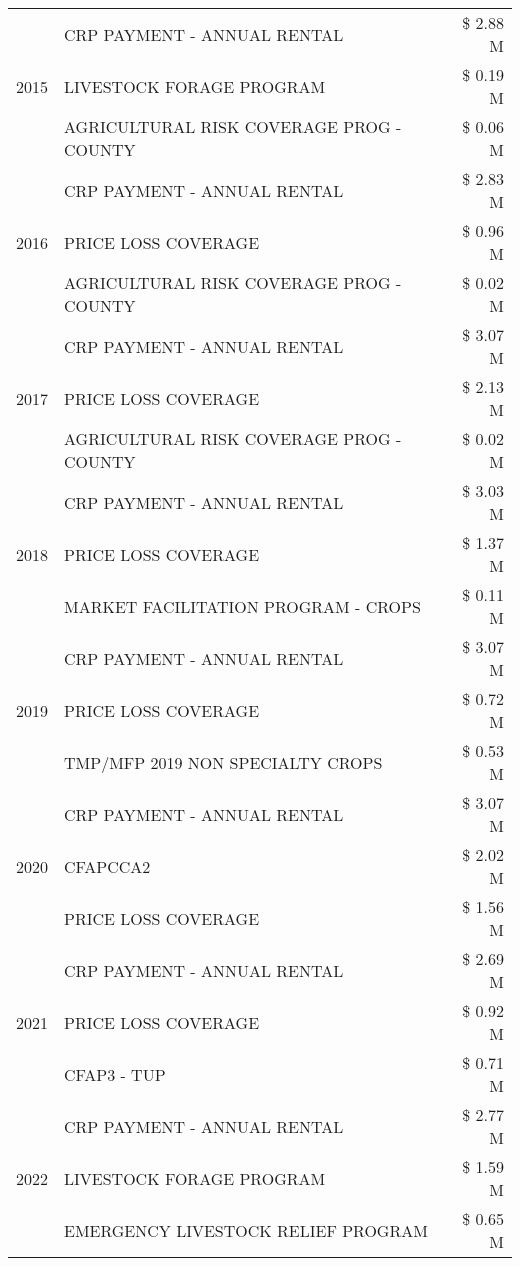 \begin{tabular}{llr}
\cline{1-3}
\multirow[t]{3}{*}{2015} & CRP PAYMENT - ANNUAL RENTAL & \$ 2.88 M \\
 & LIVESTOCK FORAGE PROGRAM & \$ 0.19 M \\
 & AGRICULTURAL RISK COVERAGE PROG - COUNTY & \$ 0.06 M \\
\cline{1-3}
\multirow[t]{3}{*}{2016} & CRP PAYMENT - ANNUAL RENTAL & \$ 2.83 M \\
 & PRICE LOSS COVERAGE & \$ 0.96 M \\
 & AGRICULTURAL RISK COVERAGE PROG - COUNTY & \$ 0.02 M \\
\cline{1-3}
\multirow[t]{3}{*}{2017} & CRP PAYMENT - ANNUAL RENTAL & \$ 3.07 M \\
 & PRICE LOSS COVERAGE & \$ 2.13 M \\
 & AGRICULTURAL RISK COVERAGE PROG - COUNTY & \$ 0.02 M \\
\cline{1-3}
\multirow[t]{3}{*}{2018} & CRP PAYMENT - ANNUAL RENTAL & \$ 3.03 M \\
 & PRICE LOSS COVERAGE & \$ 1.37 M \\
 & MARKET FACILITATION PROGRAM - CROPS & \$ 0.11 M \\
\cline{1-3}
\multirow[t]{3}{*}{2019} & CRP PAYMENT - ANNUAL RENTAL & \$ 3.07 M \\
 & PRICE LOSS COVERAGE & \$ 0.72 M \\
 & TMP/MFP 2019 NON SPECIALTY CROPS & \$ 0.53 M \\
\cline{1-3}
\multirow[t]{3}{*}{2020} & CRP PAYMENT - ANNUAL RENTAL & \$ 3.07 M \\
 & CFAPCCA2 & \$ 2.02 M \\
 & PRICE LOSS COVERAGE & \$ 1.56 M \\
\cline{1-3}
\multirow[t]{3}{*}{2021} & CRP PAYMENT - ANNUAL RENTAL & \$ 2.69 M \\
 & PRICE LOSS COVERAGE & \$ 0.92 M \\
 & CFAP3 - TUP & \$ 0.71 M \\
\cline{1-3}
\multirow[t]{3}{*}{2022} & CRP PAYMENT - ANNUAL RENTAL & \$ 2.77 M \\
 & LIVESTOCK FORAGE PROGRAM & \$ 1.59 M \\
 & EMERGENCY LIVESTOCK RELIEF PROGRAM & \$ 0.65 M \\
\cline{1-3}
\bottomrule
\end{tabular}
